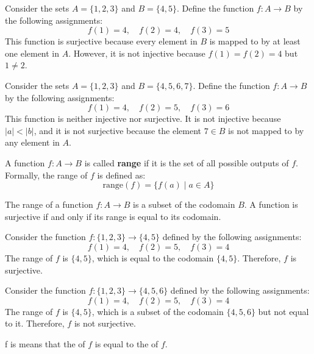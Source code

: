 \documentclass[11pt]{article}
\begin{document}
\begin{example}
    Consider the sets $A = \{1, 2, 3\}$ and $B = \{4, 5\}$. Define the function $f: A \to B$ by the following assignments:
    \[
        f(1) = 4, \quad f(2) = 4, \quad f(3) = 5
    \]
    This function is surjective because every element in $B$ is mapped to by at
    least one element in $A$. However, it is not injective because $f(1) = f(2) =
        4$ but $1 \neq 2$.
\end{example}

\begin{example}
    Consider the sets $A = \{1, 2, 3\}$ and $B = \{4, 5, 6, 7\}$. Define the function $f: A \to B$ by the following assignments:
    \[
        f(1) = 4, \quad f(2) = 5, \quad f(3) = 6
    \]
    This function is neither injective nor surjective. It is not injective because
    $ |a| <  |b|$, and it is not surjective because the element $7 \in B$ is not
    mapped to by any element in $A$.
\end{example}

\begin{definition}
    A function $f: A \to B$ is called \textbf{range} if it is the set of all possible outputs of $f$. Formally, the range of $f$ is defined as:
    \[
        \text{range}(f) = \{ f(a) \mid a \in A \}
    \]
\end{definition}
\begin{fact}
    The range of a function $f: A \to B$ is a subset of the codomain $B$. A function is surjective if and only if its range is equal to its codomain.
\end{fact}
\begin{example}
    Consider the function $f: \{1, 2, 3\} \to \{4, 5\}$ defined by the following assignments:
    \[
        f(1) = 4, \quad f(2) = 5, \quad f(3) = 4
    \]
    The range of $f$ is $\{4, 5\}$, which is equal to the codomain $\{4, 5\}$.
    Therefore, $f$ is surjective.
\end{example}
\begin{example}
    Consider the function $f: \{1, 2, 3\} \to \{4, 5, 6\}$ defined by the following assignments:
    \[
        f(1) = 4, \quad f(2) = 5, \quad f(3) = 4
    \]
    The range of $f$ is $\{4, 5\}$, which is a subset of the codomain $\{4, 5, 6\}$
    but not equal to it. Therefore, $f$ is not surjective.
\end{example}
\begin{fact}
    f is  means that the  of $f$ is equal to the  of $f$.
\end{fact}
\end{document}
